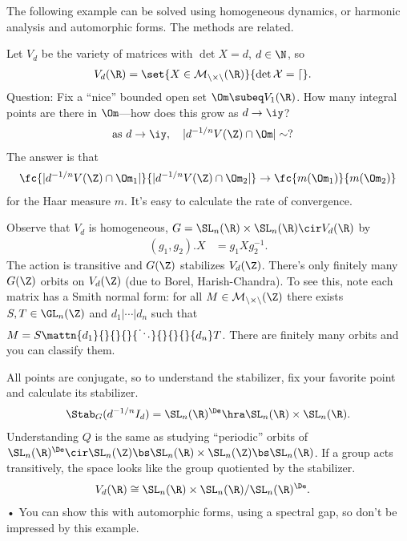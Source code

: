 The following example can be solved using homogeneous dynamics, or 
harmonic analysis and automorphic forms. The methods are related.
\begin{ex}
Let $V_d$ be the variety of matrices with $\det X=d$, $d\in \N$, so
\begin{align}
V_d(\R) &=\set{X\in \cal M_{n\times n}(\R)}{\det X=d}.
\end{align}
Question: Fix a ``nice'' bounded open set $\Om\subeq V_1(\R)$. How many integral points are there in $\Om$---how does this grow as $d\to \iy$?
\begin{align}
\text{as }d\to \iy, \quad |d^{-1/n}V(\Z) \cap \Om|&\sim ?
\end{align}
The answer is that 
\begin{align}
\fc{|d^{-1/n}V(\Z)\cap \Om_1|}{|d^{-1/n}V(\Z)\cap \Om_2|} \to \fc{m(\Om_1)}{m(\Om_2)} 
\end{align}
for the Haar measure $m$. %
It's easy to calculate the rate of convergence.

Observe that $V_d$ is homogeneous, $G=\SL_n(\R)\times \SL_n(\R)\cir V_d(\R)$ by 
\begin{align}
(g_1,g_2).X &= g_1Xg_2^{-1}.
\end{align}
The action is transitive and $G(\Z)$ stabilizes $V_d(\Z)$. There's only finitely many $G(\Z)$ orbits on $V_d(\Z)$ (due to Borel, Harish-Chandra). 
To see this, note each matrix has a Smith normal form: for all $M\in \cal M_{n\times n}(\Z)$ there exists $S,T\in \GL_n(\Z)$ and $d_1|\cdots |d_n$ such that 
$M=S\mattn{d_1}{}{}{}{\ddots}{}{}{}{d_n}T$. There are finitely many orbits and you can classify them.

All points are conjugate, so to understand the stabilizer, fix your favorite point and calculate its stabilizer.
\begin{align}
\Stab_G (d^{-1/n} I_d) = \SL_n(\R)^\De \hra \SL_n(\R)\times \SL_n(\R). 
\end{align}
Understanding $Q$ is the same as studying ``periodic'' orbits of $\SL_n(\R)^\De\cir \SL_n(\Z)\bs \SL_n(\R) \times \SL_n(\Z) \bs \SL_n(\R)$. 
If a group acts transitively, the space looks like the group quotiented by the stabilizer.
\begin{align}
V_d(\R) &\cong \SL_n(\R)\times \SL_n(\R) /\SL_n(\R)^\De.
\end{align}•
You can show this with automorphic forms, using a spectral gap, so don't be impressed by this example.
\end{ex}

